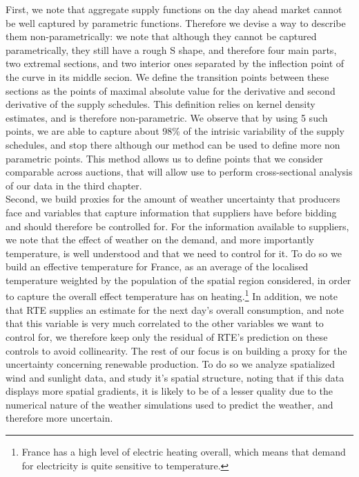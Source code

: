 First, we note that aggregate supply functions on the day ahead market cannot be well captured by parametric functions. Therefore we devise a way to describe them non-parametrically: we note that although they cannot be captured parametrically, they still have a rough S shape, and therefore four main parts, two extremal sections, and two interior ones separated by the inflection point of the curve in its middle secion. We define the transition points between these sections as the points of maximal absolute value for the derivative and second derivative of the supply schedules. This definition relies on kernel density estimates, and is therefore non-parametric. We observe that by using 5 such points, we are able to capture about 98\% of the intrisic variability of the supply schedules, and stop there although our method can be used to define more non parametric points. This method allows us to define points that we consider comparable across auctions, that will allow use to perform cross-sectional analysis of our data in the third chapter. \\

Second, we build proxies for the amount of weather uncertainty that producers face and variables that capture information that suppliers have before bidding and should therefore be controlled for. For the information available to suppliers, we note that the effect of weather on the demand, and more importantly temperature, is well understood and that we need to control for it. To do so we build an effective temperature for France, as an average of the localised temperature weighted by the population of the spatial region considered, in order to capture the overall effect temperature has on heating.\footnote{France has a high level of electric heating overall, which means that demand for electricity is quite sensitive to temperature.} In addition, we note that RTE supplies an estimate for the next day's overall consumption, and note that this variable is very much correlated to the other variables we want to control for, we therefore keep only the residual of RTE's prediction on these controls to avoid collinearity. The rest of our focus is on building a proxy for the uncertainty concerning renewable production. To do so we analyze spatialized wind and sunlight data, and study it's spatial structure, noting that if this data displays more spatial gradients, it is likely to be of a lesser quality due to the numerical nature of the weather simulations used to predict the weather, and therefore more uncertain.\\

